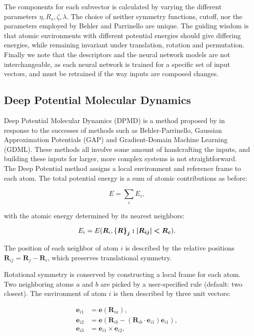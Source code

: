 The components for each subvector is calculated by varying
the different parameters $\eta, R_s, \zeta, \lambda$.
The choice of neither symmetry functions, cutoff, nor the parameters
employed by Behler and Parrinello are unique. The guiding
wisdom is that atomic environments with different
potential energies should give differing energies,
while remaining invariant under translation, rotation and permutation.
Finally we note that the descriptors and the neural network
models are not interchangeable, as each neural network
is trained for a specific set of input vectors, and must
be retrained if the way inputs are composed changes.


\subsection{Deep Potential Molecular Dynamics}
Deep Potential Molecular Dynamics (DPMD) is a method
proposed by \parencite[Zhang et al.]{PhysRevLett.120.143001}
in response to the successes of methods such as Behler-Parrinello,
Gaussian Approximation Potentials (GAP)
and Gradient-Domain Machine Learning (GDML).
These methods all involve some amount of handcrafting the inputs,
and building these inputs for larger, more complex systems is not
straightforward.
The Deep Potential method assigns a local environment and reference
frame to each atom. The total potential energy is a sum
of atomic contributions as before:

\begin{equation}
 E = \sum_i E_i , 
\end{equation}

with the atomic energy determined by its nearest neighbors:

\begin{equation}
 E_i = E(\bm{R}_i, \left\{\bm{R\right\}_j : \left| \bm{R}_{ij}
    \right| < R_c}) . 
\end{equation}

The position of each neighbor of atom $i$ is described
by the relative positions $\bm{R}_{ij} = \bm{R}_j - \bm{R}_i$,
which preserves translational symmetry.
\par
Rotational symmetry is conserved by constructing a local frame
for each atom. Two neighboring atoms $a$ and $b$ are picked by a
user-specified rule (default: two closest).
The environment of atom $i$ is then described by three unit vectors:

\begin{equation}
\begin{split}
    \bm{e}_{i1} &= \bm{e}(\bm{R}_{ia}) , \\
    \bm{e}_{i2} &= \bm{e}(\bm{R}_{ib} - (\bm{R}_{ib} \cdot \bm{e}_{i1})
    \bm{e}_{i1}) , \\
    \bm{e}_{i3} &= \bm{e}_{i1} \times \bm{e}_{i2} ,
\end{split}
\end{equation}

